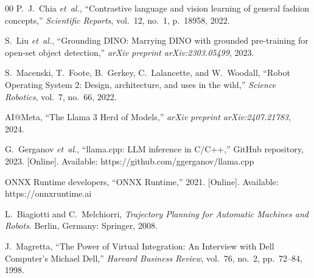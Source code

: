 \documentclass[conference]{IEEEtran}
\begin{document}
\begin{thebibliography}{00}
P.~J.~Chia \emph{et~al.}, ``Contrastive language and vision learning of
general fashion concepts,'' \emph{Scientific Reports}, vol.~12, no.~1,
p.~18958, 2022.

S.~Liu \emph{et~al.}, ``Grounding DINO: Marrying DINO with grounded
pre-training for open-set object detection,'' \emph{arXiv preprint
arXiv:2303.05499}, 2023.

S.~Macenski, T.~Foote, B.~Gerkey, C.~Lalancette, and W.~Woodall, ``Robot
Operating System 2: Design, architecture, and uses in the wild,''
\emph{Science Robotics}, vol.~7, no.~66, 2022.

AI@Meta, ``The Llama 3 Herd of Models,'' \emph{arXiv preprint
arXiv:2407.21783}, 2024.

G.~Gerganov \emph{et~al.}, ``llama.cpp: LLM inference in C/C++,'' GitHub
repository, 2023. [Online]. Available: https://github.com/ggerganov/llama.cpp

ONNX Runtime developers, ``ONNX Runtime,'' 2021. [Online]. Available:
https://onnxruntime.ai

L.~Biagiotti and C.~Melchiorri, \emph{Trajectory Planning for Automatic
Machines and Robots}. Berlin, Germany: Springer, 2008.

J.~Magretta, ``The Power of Virtual Integration: An Interview with Dell
Computer's Michael Dell,'' \emph{Harvard Business Review}, vol.~76, no.~2,
pp.~72--84, 1998.

\end{thebibliography}
\end{document}
